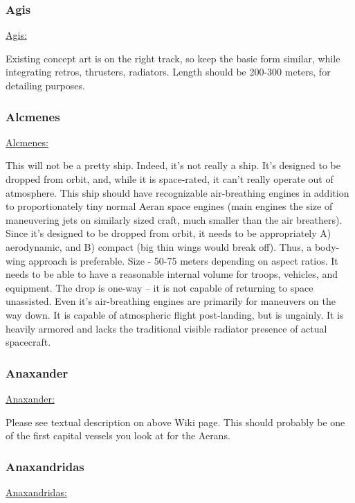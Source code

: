 \subsubsection{Agis}
\href{http://vegastrike.sourceforge.net/wiki/Vessel:Agis}{Agis:}

Existing concept art is on the right track, so keep the basic form
similar, while integrating retros, thrusters, radiators. Length should
be 200-300 meters, for detailing purposes.



\subsubsection{Alcmenes}
\href{http://vegastrike.sourceforge.net/wiki/Vessel:Alcmenes}{Alcmenes:}

This will not be a pretty ship. Indeed, it's not really a ship. It's
designed to be dropped from orbit, and, while it is space-rated, it
can't really operate out of atmosphere. This ship should have
recognizable air-breathing engines in addition to proportionately tiny
normal Aeran space engines (main engines the size of maneuvering jets
on similarly sized craft, much smaller than the air breathers). Since
it's designed to be dropped from orbit, it needs to be appropriately
A) aerodynamic, and B) compact (big thin wings would break off). Thus,
a body-wing approach is preferable. Size - 50-75 meters depending on
aspect ratios. It needs to be able to have a reasonable internal
volume for troops, vehicles, and equipment. The drop is one-way -- it
is not capable of returning to space unassisted. Even it's
air-breathing engines are primarily for maneuvers on the way down. It
is capable of atmospheric flight post-landing, but is ungainly. It is
heavily armored and lacks the traditional visible radiator presence of
actual spacecraft.

\subsubsection{Anaxander}
\href{http://vegastrike.sourceforge.net/wiki/Vessel:Anaxander}{Anaxander:}

Please see textual description on above Wiki page. This should
probably be one of the first capital vessels you look at for the
Aerans.


\subsubsection{Anaxandridas}
\href{http://vegastrike.sourceforge.net/wiki/Vessel:Anaxandridas}{Anaxandridas:}

